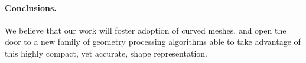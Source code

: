 \paragraph{Conclusions.} We believe that our work will foster adoption of curved meshes, and open the door to a new family of geometry processing algorithms able to take advantage of this highly compact, yet accurate, shape representation.


